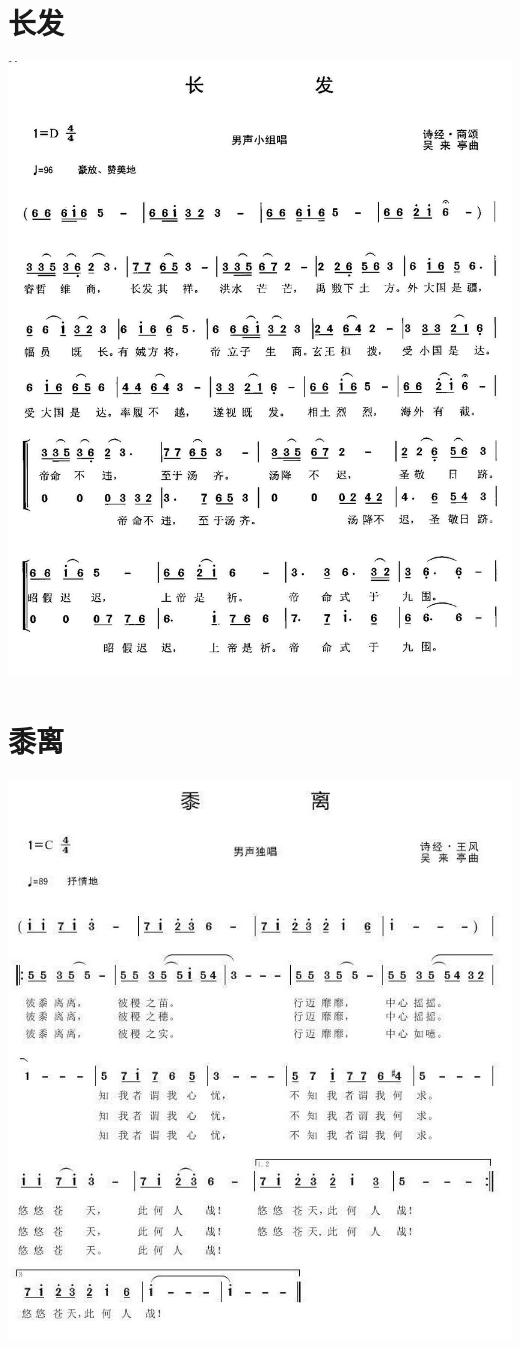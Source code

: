\documentclass[cn,pad,twocol]{elegantbook}
\begin{document}
\section{长发}      \includegraphics[width=\textwidth]{rpi400/20210123-长发.jpg}
\section{黍离}      \includegraphics[width=\textwidth]{rpi400/20210123-黍离.jpg}
\end{document}

